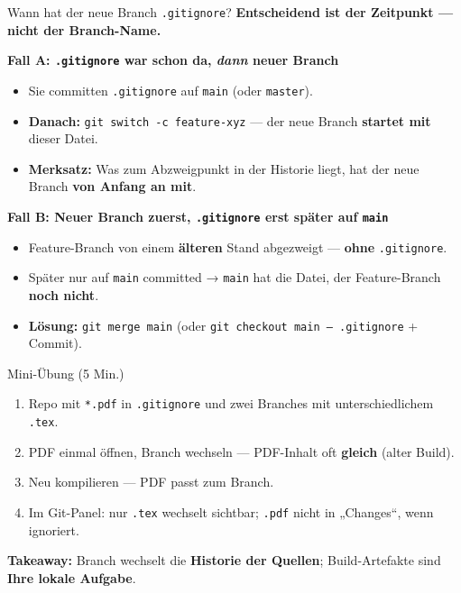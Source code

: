 \documentclass{beamer}
\begin{document}
\begin{frame}{Wann hat der neue Branch \texttt{.gitignore}?}
\textbf{Entscheidend ist der Zeitpunkt — nicht der Branch-Name.}

\vspace{0.4em}
\textbf{Fall A: \texttt{.gitignore} war schon da, \emph{dann} neuer Branch}
\begin{itemize}
\item Sie committen \texttt{.gitignore} auf \texttt{main} (oder \texttt{master}).
\item \textbf{Danach:} \texttt{git switch -c feature-xyz} — der neue Branch \textbf{startet mit} dieser Datei.
\item \textbf{Merksatz:} Was zum Abzweigpunkt in der Historie liegt, hat der neue Branch \textbf{von Anfang an mit}.
\end{itemize}

\vspace{0.3em}
\textbf{Fall B: Neuer Branch zuerst, \texttt{.gitignore} erst später auf \texttt{main}}
\begin{itemize}
\item Feature-Branch von einem \textbf{älteren} Stand abgezweigt — \textbf{ohne} \texttt{.gitignore}.
\item Später nur auf \texttt{main} committed → \texttt{main} hat die Datei, der Feature-Branch \textbf{noch nicht}.
\item \textbf{Lösung:} \texttt{git merge main} (oder \texttt{git checkout main -- .gitignore} + Commit).
\end{itemize}

\end{frame}

\begin{frame}[fragile]{Mini-Übung (5 Min.)}
\begin{enumerate}
\item Repo mit \texttt{*.pdf} in \texttt{.gitignore} und zwei Branches mit unterschiedlichem \texttt{.tex}.
\item PDF einmal öffnen, Branch wechseln — PDF-Inhalt oft \textbf{gleich} (alter Build).
\item Neu kompilieren — PDF passt zum Branch.
\item Im Git-Panel: nur \texttt{.tex} wechselt sichtbar; \texttt{.pdf} nicht in „Changes“, wenn ignoriert.
\end{enumerate}
\vspace{0.3em}
\textbf{Takeaway:} Branch wechselt die \textbf{Historie der Quellen}; Build-Artefakte sind \textbf{Ihre lokale Aufgabe}.
\end{frame}
\end{document}
